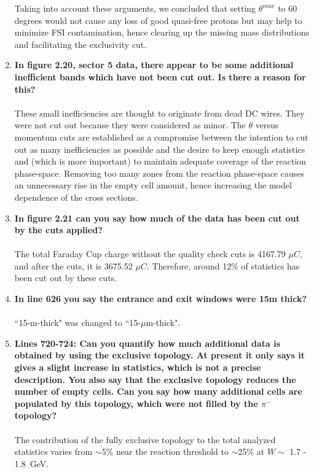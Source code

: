 \documentclass[,superscriptaddress,showpacs,amssymb,amsmath,amsfonts,linenumbers,article]{revtex4-1}
\begin{document}
\begin{enumerate}[label=\textbf{\arabic*}.]
Taking into account these arguments, we concluded that setting $\theta^{max}$ to 60 degrees would not cause any loss of good quasi-free protons but may help to minimize FSI contamination, hence clearing up the missing mass distributions and facilitating the exclusivity cut.

\item {\bf In figure 2.20, sector 5 data, there appear to be some additional inefficient bands which have not been cut out. Is there a reason for this?}\\ \\
These small inefficiencies are thought to originate from dead DC wires. They were not cut out because they were considered as minor. The $\theta$ versus momentum cuts are established as a compromise between the intention to cut out as many inefficiencies as possible and the desire to keep enough statistics and (which is more important) to maintain adequate coverage of the reaction phase-space. Removing too many zones from the reaction phase-space causes an unnecessary rise in the empty cell amount, hence increasing the model dependence of the cross sections.

\item {\bf In figure 2.21 can you say how much of the data has been cut out by the cuts applied?}\\ \\
The total Faraday Cup charge without the quality check cuts is 4167.79 $\mu C$, and after the cuts, it is 3675.52 $\mu C$. Therefore, around 12\% of statistics has been cut out by these cuts.

\item {\bf In line 626 you say the entrance and exit windows were 15m thick?}\\ \\
``15-m-thick" was changed to ``15-$\mu$m-thick".

\item {\bf Lines 720-724: Can you quantify how much additional data is obtained by using the exclusive topology. At present it only says it gives a slight increase in statistics, which is not a precise description. You also say that the exclusive topology reduces the number of empty cells. Can you say how many additional cells are populated by this topology, which were not filled by the $\pi^{-}$ topology?}\\ \\
The contribution of the fully exclusive topology to the total analyzed statistics varies from $\sim$5\% near the reaction threshold to $\sim$25\% at $W \sim$ 1.7 - 1.8~GeV.


\end{enumerate}
\end{document}
